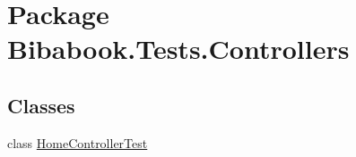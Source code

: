 \hypertarget{namespace_bibabook_1_1_tests_1_1_controllers}{}\section{Package Bibabook.\+Tests.\+Controllers}
\label{namespace_bibabook_1_1_tests_1_1_controllers}
\subsection*{Classes}
\begin{DoxyCompactItemize}
\item 
class \hyperlink{class_bibabook_1_1_tests_1_1_controllers_1_1_home_controller_test}{Home\+Controller\+Test}
\end{DoxyCompactItemize}
